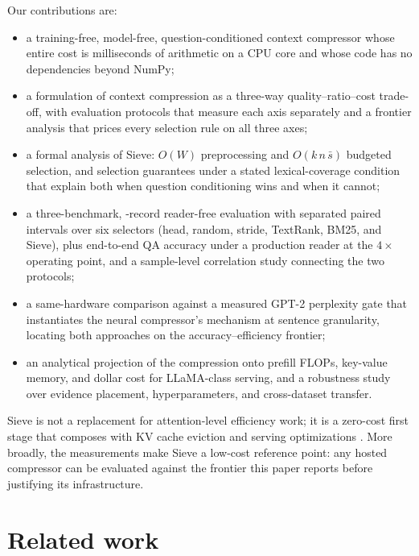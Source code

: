 \documentclass[preprint,12pt]{elsarticle}
\theoremstyle{remark}
\newcommand{\method}{Sieve}
\begin{document}
Our contributions are:
\begin{itemize}
\item a training-free, model-free, question-conditioned context
compressor whose entire cost is milliseconds of arithmetic on a CPU
core and whose code has no dependencies beyond NumPy;
\item a formulation of context compression as a three-way
quality--ratio--cost trade-off, with evaluation protocols that measure
each axis separately and a frontier analysis that prices every
selection rule on all three axes;
\item a formal analysis of \method{}: $O(W)$ preprocessing and
$O(k\,n\,\bar{s})$ budgeted selection, and selection guarantees under
a stated lexical-coverage condition that explain both when question
conditioning wins and when it cannot;
\item a three-benchmark, \TotalRecords{}-record reader-free evaluation
with separated paired intervals over six selectors (head, random,
stride, TextRank, BM25, and \method{}), plus end-to-end QA accuracy
under a production reader at the $4\times$ operating point, and a
sample-level correlation study connecting the two protocols;
\item a same-hardware comparison against a measured GPT-2 perplexity
gate that instantiates the neural compressor's mechanism at sentence
granularity, locating both approaches on the accuracy--efficiency
frontier;
\item an analytical projection of the compression onto prefill FLOPs,
key-value memory, and dollar cost for LLaMA-class serving, and a
robustness study over evidence placement, hyperparameters, and
cross-dataset transfer.
\end{itemize}

\method{} is not a replacement for attention-level efficiency work; it
is a zero-cost first stage that composes with KV cache eviction
\citep{zhang2023h2o,xiao2023streaming} and serving optimizations
\citep{dao2022flashattention,kwon2023vllm}. More broadly, the
measurements make \method{} a low-cost reference point: any hosted
compressor can be evaluated against the frontier this paper reports
before justifying its infrastructure.

\section{Related work}
\label{sec:related}
\end{document}

